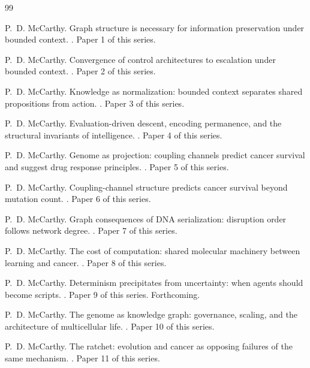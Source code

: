\documentclass[11pt]{article}
\begin{document}
\begin{thebibliography}{99}

P.~D. McCarthy.
\newblock Graph structure is necessary for information preservation under bounded context.
. Paper 1 of this series.

P.~D. McCarthy.
\newblock Convergence of control architectures to escalation under bounded context.
. Paper 2 of this series.

P.~D. McCarthy.
\newblock Knowledge as normalization: bounded context separates shared propositions from action.
. Paper 3 of this series.

P.~D. McCarthy.
\newblock Evaluation-driven descent, encoding permanence, and the structural invariants of intelligence.
. Paper 4 of this series.

P.~D. McCarthy.
\newblock Genome as projection: coupling channels predict cancer survival and suggest drug response principles.
. Paper 5 of this series.

P.~D. McCarthy.
\newblock Coupling-channel structure predicts cancer survival beyond mutation count.
. Paper 6 of this series.

P.~D. McCarthy.
\newblock Graph consequences of DNA serialization: disruption order follows network degree.
. Paper 7 of this series.

P.~D. McCarthy.
\newblock The cost of computation: shared molecular machinery between learning and cancer.
. Paper 8 of this series.

P.~D. McCarthy.
\newblock Determinism precipitates from uncertainty: when agents should become scripts.
. Paper 9 of this series. Forthcoming.

P.~D. McCarthy.
\newblock The genome as knowledge graph: governance, scaling, and the architecture of multicellular life.
. Paper 10 of this series.

P.~D. McCarthy.
\newblock The ratchet: evolution and cancer as opposing failures of the same mechanism.
. Paper 11 of this series.

\end{thebibliography}
\end{document}
